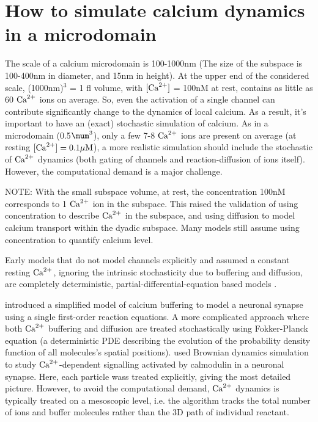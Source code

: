 \section{How to simulate calcium dynamics in a microdomain}
\label{sec:spatial-model-single}

The scale of a calcium microdomain is 100-1000nm (The size of the subspace is
100-400nm in diameter, and 15nm in height). At the upper end of the considered
scale, (1000nm)$^3$ = 1 fl volume, with $[{\text{Ca}^{2+}}]$ = 100nM at rest, contains as
little as 60 ${\text{Ca}^{2+}}$ ions on average. So, even the activation of a single channel
can contribute significantly change to the dynamics of local calcium. As a
result, it's important to have an (exact) stochastic simulation of calcium.
As in a microdomain (0.5$\mum^3$), only a few 7-8 ${\text{Ca}^{2+}}$ ions are present on
average (at resting $[{\text{Ca}^{2+}}]=0.1{\mu\text{M}}$), a more realistic simulation should include
the stochastic of ${\text{Ca}^{2+}}$ dynamics (both gating of channels and
reaction-diffusion of ions itself). However, the computational demand is a major
challenge.

\begin{framed}
NOTE: With the small subspace volume, at rest, the concentration 100nM
corresponds to 1 ${\text{Ca}^{2+}}$ ion in the subspace. This raised the validation of using
concentration to describe ${\text{Ca}^{2+}}$ in the subspace, and using diffusion to model
calcium transport within the dyadic subspace. Many models still assume using
concentration to quantify calcium level.
\end{framed}

Early models that do not model channels explicitly and assumed a constant
resting ${\text{Ca}^{2+}}$, ignoring the intrinsic stochasticity due to buffering and
diffusion, are completely deterministic, partial-differential-equation based
models \citep{smith1988, jiang1999, uttenweiler2002}. 

\citep{bhalla2004} introduced a simplified model of calcium buffering to model a
neuronal synapse using a single first-order reaction equations. A more
complicated approach where both ${\text{Ca}^{2+}}$ buffering and diffusion are treated
stochastically using Fokker-Planck equation \citep{winslow2006} (a
deterministic PDE describing the evolution of the probability density function
of all molecules's spatial positions).
\citep{keller2008} used Brownian dynamics simulation to study ${\text{Ca}^{2+}}$-dependent
signalling activated by calmodulin in a neuronal synapse. Here, each particle
wass treated explicitly, giving the most detailed picture. However, to avoid the
computational demand, ${\text{Ca}^{2+}}$ dynamics is typically treated on
a mesoscopic level, i.e. the algorithm tracks the total number of ions and
buffer molecules rather than the 3D path of individual reactant.

